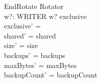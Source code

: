 \documentclass{article}
\begin{document}
\begin{schema}{EndRotate}
  \Delta Rotator \\
  w?: WRITER
\where
  w? \in exclusive \\
  exclusive' = \emptyset \\
  shared' = shared \\
  size' = size \\
  backups' = backups \\
  maxBytes' = maxBytes \\
  backupCount' = backupCount
\end{schema}
\end{document}
